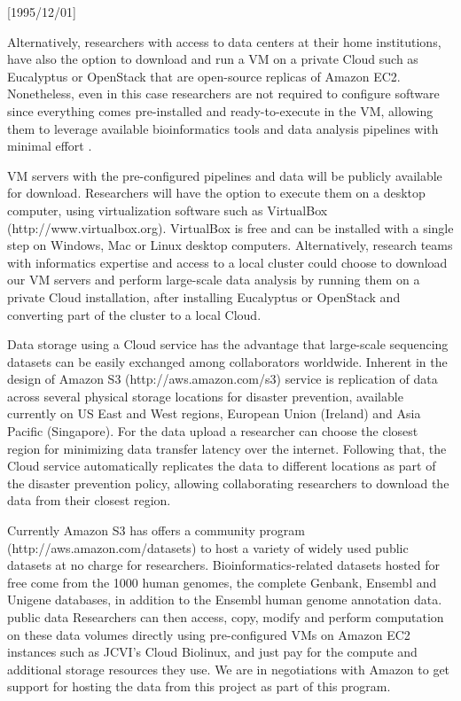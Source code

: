 \NeedsTeXFormat{LaTeX2e}[1995/12/01] \documentclass[10pt]{bmc_article}
\newenvironment{bmcformat}{\begin{raggedright}\baselineskip20pt\sloppy\setboolean{publ}{false}}{\end{raggedright}\baselineskip20pt\sloppy}
\begin{document}
\begin{bmcformat}
Alternatively, 
researchers with access to data centers at their home institutions, have also the option to download 
and run a VM on a private Cloud such as Eucalyptus \cite{euca} or OpenStack \cite{openstack} that 
are open-source replicas of Amazon EC2. Nonetheless, even in this case researchers are not required
to configure software since everything comes pre-installed and ready-to-execute in the VM, allowing 
them to leverage available bioinformatics tools and data analysis pipelines with minimal effort \cite{Krampis2012}.

VM servers with the pre-configured pipelines and data will be publicly available for download. Researchers
will have the option to execute them on a desktop computer, using virtualization software such as VirtualBox
(http://www.virtualbox.org). VirtualBox is free and can be installed with a single step on Windows, Mac or
Linux desktop computers.  Alternatively, research teams with informatics expertise and access to a local
cluster could choose to download our VM servers and perform large-scale data analysis by running them on a
private Cloud installation, after installing Eucalyptus or OpenStack and converting part of the cluster to a
local Cloud. 

Data storage using a Cloud service has the advantage that large-scale sequencing datasets can be easily
exchanged among collaborators worldwide. Inherent in the design of Amazon S3 (http://aws.amazon.com/s3)
service is replication of data across several physical storage locations for disaster prevention, available
currently on US East and West regions, European Union (Ireland) and Asia Pacific (Singapore). For the data
upload a researcher can choose the closest region for minimizing data transfer latency over the internet.
Following that, the Cloud service automatically replicates the data to different locations as part of the
disaster prevention policy, allowing collaborating researchers to download the data from their closest region.

Currently Amazon S3 has offers a community program (http://aws.amazon.com/datasets) to host a variety of
widely used public datasets at no charge for  researchers.  Bioinformatics-related datasets hosted for free
come from the 1000 human genomes, the complete Genbank, Ensembl and Unigene databases, in addition to the
Ensembl human genome annotation data. public data Researchers can then access, copy, modify and perform
computation on these data volumes directly using pre-configured VMs on Amazon EC2 instances such as JCVI's
Cloud Biolinux, and just pay for the compute and additional storage resources they use. We are in negotiations
with Amazon to get support for hosting the data from this project as part of this program.



\end{bmcformat}
\end{document}
